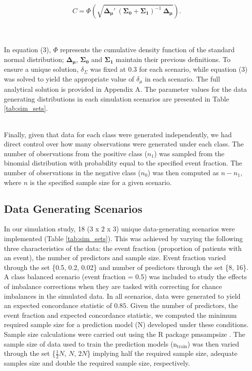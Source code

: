 \documentclass[AMA,STIX1COL,]{WileyNJD-v2}
\begin{document}
\begin{equation}
C = \Phi \left( \sqrt{\pmb{\Delta_\mu}{'}\  (\pmb{\Sigma_0} + \pmb{\Sigma_1})^{-1} \ \pmb{\Delta_{\mu}}} \right).
\end{equation}\\
\strut \\
In equation (3), \(\Phi\) represents the cumulative density function of
the standard normal distribution; \(\pmb{\Delta_\mu}\),
\(\pmb{\Sigma_0}\) and \(\pmb{\Sigma_1}\) maintain their previous
definitions. To ensure a unique solution, \(\delta_\Sigma\) was fixed at
0.3 for each scenario, while equation (3) was solved to yield the
appropriate value of \(\delta_\mu\) in each scenario. The full
analytical solution is provided in Appendix A. The parameter values for
the data generating distributions in each simulation scenarios are
presented in Table \ref{tab:sim_sets}.\\
\strut \\
Finally, given that data for each class were generated independently, we
had direct control over how many observations were generated under each
class. The number of observations from the positive class (\(n_1\)) was
sampled from the binomial distribution with probability equal to the
specified event fraction. The number of observations in the negative
class (\(n_0\)) was then computed as \(n - n_1\), where \(n\) is the
specified sample size for a given scenario.\\

\hypertarget{data-generating-scenarios}{%
\subsection{Data Generating Scenarios}\label{data-generating-scenarios}}

In our simulation study, 18 (\(3\) x \(2\) x \(3\)) unique
data-generating scenarios were implemented (Table \ref{tab:sim_sets}).
This was achieved by varying the following three characteristics of the
data: the event fraction (proportion of patients with an event), the
number of predictors and sample size. Event fraction varied through the
set \{0.5, 0.2, 0.02\} and number of predictors through the set \{8,
16\}. A class balanced scenario (event fraction = 0.5) was included to
study the effects of imbalance corrections when they are tasked with
correcting for chance imbalances in the simulated data. In all
scenarios, data were generated to yield an expected concordance
statistic of \(0.85\). Given the number of predictors, the event
fraction and expected concordance statistic, we computed the minimum
required sample size for a prediction model (N) developed under these
conditions. Sample size calculations were carried out using the R
package pmsampsize \citep{pmsampsize}. The sample size of data used to
train the prediction models (\(\mathrm{n}_{\mathrm{train}}\)) was then
varied through the set \{\(\frac{1}{2}N\), \(N\), \(2N\)\} implying half
the required sample size, adequate samples size and double the required
sample size, respectively.\\
\end{document}

